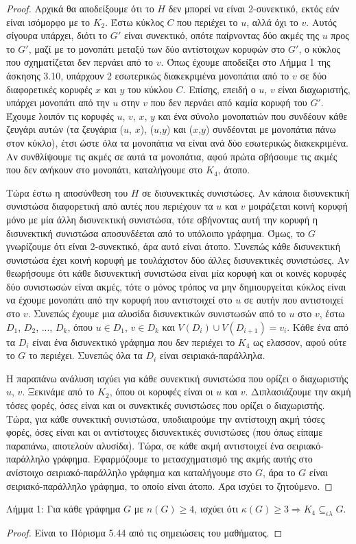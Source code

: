 \documentclass[a4paper, oneside, 11pt]{article}
\theoremstyle{definition}
\begin{document}
\begin{enumerate}
\begin{proof}
Αρχικά θα αποδείξουμε ότι το $H$ δεν μπορεί να είναι 2-συνεκτικό, εκτός εάν είναι ισόμορφο με το $K_2$. Έστω κύκλος $C$ που περιέχει το $u$, αλλά όχι το $v$. Αυτός σίγουρα υπάρχει, διότι το 
$G'$ είναι συνεκτικό, οπότε παίρνοντας δύο ακμές της $u$ προς το $G'$, μαζί με το μονοπάτι μεταξύ των δύο αντίστοιχων κορυφών στο $G'$, ο κύκλος που σχηματίζεται δεν περνάει από το $v$. Όπως έχουμε
αποδείξει στο Λήμμα 1 της άσκησης 3.10, υπάρχουν 2 εσωτερικώς διακεκριμένα μονοπάτια από το $v$ σε δύο διαφορετικές κορυφές $x$ και $y$ του κύκλου $C$. Επίσης, επειδή ο $u$, $v$ είναι διαχωριστής, 
υπάρχει μονοπάτι
από την $u$ στην $v$ που δεν περνάει από καμία κορυφή του $G'$. Έχουμε λοιπόν τις κορυφές $u$, $v$, $x$, $y$ και ένα σύνολο μονοπατιών που συνδέουν κάθε ζευγάρι αυτών (τα ζευγάρια ($u$, $x$),
($u$,$y$) και ($x$,$y$) συνδέονται με μονοπάτια πάνω στον κύκλο), έτσι ώστε όλα τα μονοπάτια να
είναι ανά δύο εσωτερικώς διακεκριμένα. Αν συνθλίψουμε τις ακμές σε αυτά τα μονοπάτια, αφού πρώτα σβήσουμε τις ακμές που δεν ανήκουν στο μονοπάτι, καταλήγουμε στο $K_4$, άτοπο.

Τώρα έστω η αποσύνθεση του $H$ σε δισυνεκτικές συνιστώσες. Αν κάποια δισυνεκτική συνιστώσα διαφορετική από αυτές που περιέχουν τα $u$ και $v$ μοιράζεται κοινή κορυφή μόνο με μία άλλη δισυνεκτική
συνιστώσα, τότε σβήνοντας αυτή την κορυφή η δισυνεκτική συνιστώσα αποσυνδέεται από το υπόλοιπο γράφημα. Όμως, το $G$ γνωρίζουμε ότι είναι 2-συνεκτικό, άρα αυτό είναι άτοπο. Συνεπώς κάθε δισυνεκτική
συνιστώσα έχει κοινή κορυφή με τουλάχιστον δύο άλλες δισυνεκτικές συνιστώσες. Αν θεωρήσουμε ότι κάθε δισυνεκτική συνιστώσα είναι μία κορυφή και οι κοινές κορυφές δύο συνιστωσών είναι ακμές, τότε ο
μόνος τρόπος να μην δημιουργείται κύκλος είναι να έχουμε μονοπάτι από την κορυφή που αντιστοιχεί στο $u$ σε αυτήν που αντιστοιχεί στο $v$. Συνεπώς έχουμε μια αλυσίδα δισυνεκτικών συνιστωσών από το $u$ στο $v$, έστω $D_1$, $D_2$, ..., $D_k$, όπου $u\in D_1$, $v\in D_k$ και $V(D_i)\cup V(D_{i+1}) = v_i$. Κάθε ένα από τα $D_i$ είναι ένα δισυνεκτικό γράφημα που δεν περιέχει το $K_4$ ως ελασσον, αφού 
ούτε το $G$ το περιέχει. Συνεπώς όλα τα $D_i$ είναι σειριακά-παράλληλα.

Η παραπάνω ανάλυση ισχύει για κάθε συνεκτική συνιστώσα που ορίζει ο διαχωριστής $u$, $v$. Ξεκινάμε από το $K_2$, όπου οι κορυφές είναι οι $u$ και $v$. Διπλασιάζουμε την ακμή τόσες φορές, όσες είναι
και οι συνεκτικές συνιστώσες που ορίζει ο διαχωριστής. Τώρα, για κάθε συνεκτική συνιστώσα, υποδιαιρούμε την αντίστοιχη ακμή τόσες φορές, όσες είναι και οι αντίστοιχες δισυνεκτικές συνιστώσες (που όπως είπαμε
παραπάνω, αποτελούν αλυσίδα). Τώρα, σε κάθε ακμή αντιστοιχεί ένα σειριακό-παράλληλο γράφημα. Εφαρμόζουμε το μετασχηματισμό της ακμής αυτής στο ανίστοιχο 
σειριακό-παράλληλο γράφημα και καταλήγουμε στο $G$, άρα το $G$ είναι 
σειριακό-παράλληλο γράφημα, το οποίο είναι άτοπο. Άρα ισχύει το ζητούμενο.
	\end{proof}     
Λήμμα 1: Για κάθε γράφημα $G$ με $n(G)\geq 4$, ισχύει ότι $\kappa(G)\geq 3 \Rightarrow K_4 \subseteq_{\epsilon\lambda} G$.
	\begin{proof}
Είναι το Πόρισμα 5.44 από τις σημειώσεις του μαθήματος.
	\end{proof}
 

\end{enumerate}
\end{document}
